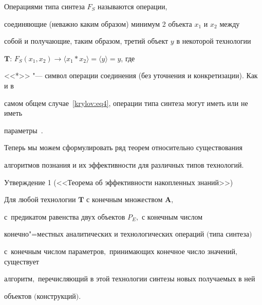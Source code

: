 \smallskip



\begin{definition}[2]Операциями типа синтеза $F_{S}$ называются операции,

соединяющие (неважно каким образом) минимум 2 объекта $x_{1}$ и $x_{2}$ между

собой и получающие, таким образом, третий объект $y$ в некоторой технологии

$\mathbf{T}$: $F_{S}(x_{1}, x_{2})\to \langle x_{1}*x_{2}\rangle=\langle y \rangle= y$, где

<<*>> "--- символ операции соединения (без уточнения и конкретизации). Как и в

самом общем случае~\eqref{krylov:eq4}, операции типа синтеза могут иметь или не иметь

параметры~\cite{krylov:bib3,krylov:bib6}.

\end{definition}



\smallskip



Теперь мы можем сформулировать ряд теорем относительно существования

алгоритмов познания и их эффективности для различных типов технологий.



\smallskip



\hypertarget{kr:utv1}{}



\begin{newthm}{Утверждение 1 (<<Теорема об эффективности накопленных знаний>>)}

Для любой технологии $\mathbf{T}$ с конечным множеством $\mathbf{A},$ 

с~предикатом равенства двух объектов $P_{E},$ с конечным числом

конечно"=местных аналитических и технологических операций $($типа синтеза$)$ 

с~конечным числом па\-ра\-мет\-ров$,$ принимающих конечное число значений$,$ существует

алгоритм$,$ перечисляющий в этой технологии синтезы новых получаемых в ней

объектов $($конструкций$).$

\end{newthm}



\smallskip




